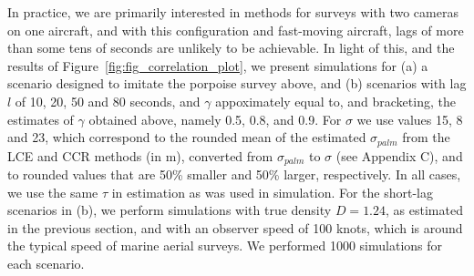 \documentclass[useAMS, usenatbib, referee]{biom}\usepackage[]{graphicx}\usepackage[]{color}
\begin{document}



In practice, we are primarily interested in methods for surveys with two cameras on one aircraft, and with this configuration and fast-moving aircraft, lags of more than some tens of seconds are unlikely to be achievable. In light of this, and the results of Figure~\ref{fig:fig_correlation_plot}, we present simulations for (a) a scenario designed to imitate the porpoise survey above, and (b) scenarios with lag $l$ of 10, 20, 50 and 80 seconds, and $\gamma$ appoximately equal to, and bracketing, the estimates of $\gamma$ obtained above, namely 0.5, 0.8, and 0.9. For $\sigma$ we use values 15, 8 and 23, which correspond to the rounded mean of the estimated $\sigma_{palm}$ from the LCE and CCR methods (in m), converted from $\sigma_{palm}$ to $\sigma$ (see Appendix C), and to rounded values that are 50\% smaller and 50\% larger, respectively. In all cases, we use the same $\tau$ in estimation as was used in simulation. For the short-lag scenarios in (b), we perform simulations with true density $D=1.24$, as estimated in the previous section, and with an observer speed of 100 knots, which is around the typical speed of marine aerial surveys. We performed 1000 simulations for each scenario.
\end{document}

